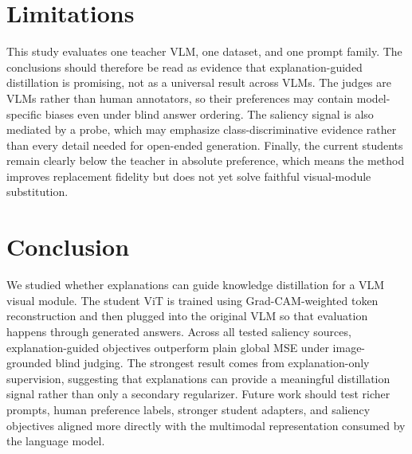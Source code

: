 \section{Limitations}
\label{sec:limitations}

This study evaluates one teacher VLM, one dataset, and one prompt family.
The conclusions should therefore be read as evidence that explanation-guided distillation is promising, not as a universal result across VLMs.
The judges are VLMs rather than human annotators, so their preferences may contain model-specific biases even under blind answer ordering.
The saliency signal is also mediated by a probe, which may emphasize class-discriminative evidence rather than every detail needed for open-ended generation.
Finally, the current students remain clearly below the teacher in absolute preference, which means the method improves replacement fidelity but does not yet solve faithful visual-module substitution.

\section{Conclusion}
\label{sec:conclusion}

We studied whether explanations can guide knowledge distillation for a VLM visual module.
The student ViT is trained using Grad-CAM-weighted token reconstruction and then plugged into the original VLM so that evaluation happens through generated answers.
Across all tested saliency sources, explanation-guided objectives outperform plain global MSE under image-grounded blind judging.
The strongest result comes from explanation-only supervision, suggesting that explanations can provide a meaningful distillation signal rather than only a secondary regularizer.
Future work should test richer prompts, human preference labels, stronger student adapters, and saliency objectives aligned more directly with the multimodal representation consumed by the language model.
